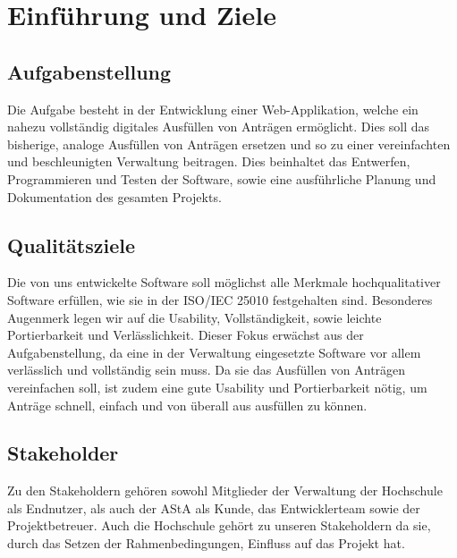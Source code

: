 \chapter{Einführung und Ziele}\label{ch:einfuhrung-und-ziele}

\section{Aufgabenstellung}\label{sec:aufgabenstellung}
Die Aufgabe besteht in der Entwicklung einer Web-Applikation, welche ein nahezu vollständig digitales
Ausfüllen von Anträgen ermöglicht. Dies soll das bisherige, analoge Ausfüllen von Anträgen ersetzen
und so zu einer vereinfachten und beschleunigten Verwaltung beitragen. Dies beinhaltet das 
Entwerfen, Programmieren und Testen der Software, sowie eine ausführliche Planung und
Dokumentation des gesamten Projekts.

\section{Qualitätsziele}\label{sec:qualitatsziele}
Die von uns entwickelte Software soll möglichst alle Merkmale hochqualitativer Software erfüllen, wie 
sie in der ISO/IEC 25010 festgehalten sind. Besonderes Augenmerk legen wir auf die Usability, 
Vollständigkeit, sowie leichte Portierbarkeit und Verlässlichkeit. Dieser Fokus erwächst aus der
Aufgabenstellung, da eine in der Verwaltung eingesetzte Software vor allem verlässlich und vollständig
sein muss. Da sie das Ausfüllen von Anträgen vereinfachen soll, ist zudem eine gute Usability und
Portierbarkeit nötig, um Anträge schnell, einfach und von überall aus ausfüllen zu können.

\section{Stakeholder}\label{sec:stakeholder}
Zu den Stakeholdern gehören sowohl Mitglieder der Verwaltung der Hochschule als Endnutzer, als auch
der AStA als Kunde, das Entwicklerteam sowie der Projektbetreuer. Auch die Hochschule 
gehört zu unseren Stakeholdern da sie, durch das Setzen der Rahmenbedingungen, Einfluss auf das 
Projekt hat.